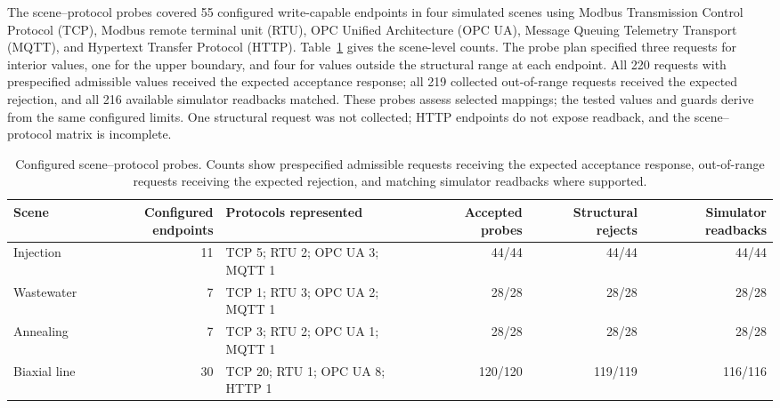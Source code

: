 The scene--protocol probes covered 55 configured write-capable endpoints in four simulated scenes using Modbus Transmission Control Protocol (TCP), Modbus remote terminal unit (RTU), OPC Unified Architecture (OPC UA), Message Queuing Telemetry Transport (MQTT), and Hypertext Transfer Protocol (HTTP). Table~\ref{tab:scene-probe-results} gives the scene-level counts. The probe plan specified three requests for interior values, one for the upper boundary, and four for values outside the structural range at each endpoint. All 220 requests with prespecified admissible values received the expected acceptance response; all 219 collected out-of-range requests received the expected rejection, and all 216 available simulator readbacks matched. These probes assess selected mappings; the tested values and guards derive from the same configured limits. One structural request was not collected; HTTP endpoints do not expose readback, and the scene--protocol matrix is incomplete.

\begin{table}[!t]
\centering
\caption{Configured scene--protocol probes. Counts show prespecified admissible requests receiving the expected acceptance response, out-of-range requests receiving the expected rejection, and matching simulator readbacks where supported.}
\label{tab:scene-probe-results}
\footnotesize
\setlength{\tabcolsep}{3pt}
\begin{tabularx}{\textwidth}{@{}>{\raggedright\arraybackslash}p{1.55cm}r X r r r@{}}
\toprule
Scene & Configured endpoints & Protocols represented & Accepted probes & Structural rejects & Simulator readbacks \\
\midrule
Injection & 11 & TCP 5; RTU 2; OPC UA 3; MQTT 1 & 44/44 & 44/44 & 44/44 \\
Wastewater & 7 & TCP 1; RTU 3; OPC UA 2; MQTT 1 & 28/28 & 28/28 & 28/28 \\
Annealing & 7 & TCP 3; RTU 2; OPC UA 1; MQTT 1 & 28/28 & 28/28 & 28/28 \\
Biaxial line & 30 & TCP 20; RTU 1; OPC UA 8; HTTP 1 & 120/120 & 119/119 & 116/116 \\
\bottomrule
\end{tabularx}
\end{table}

